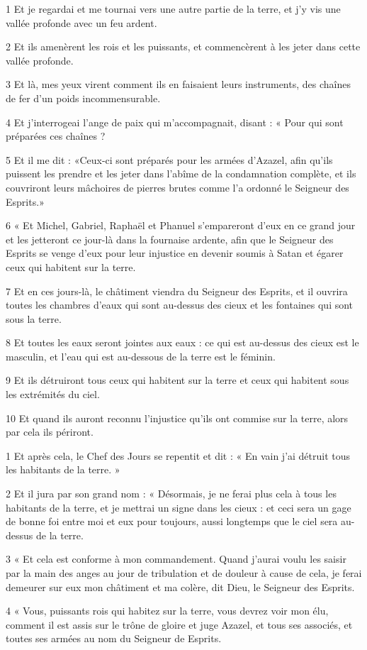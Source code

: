 \par 1 Et je regardai et me tournai vers une autre partie de la terre, et j'y vis une vallée profonde avec un feu ardent.
\par 2 Et ils amenèrent les rois et les puissants, et commencèrent à les jeter dans cette vallée profonde.
\par 3 Et là, mes yeux virent comment ils en faisaient leurs instruments, des chaînes de fer d'un poids incommensurable.
\par 4 Et j'interrogeai l'ange de paix qui m'accompagnait, disant : « Pour qui sont préparées ces chaînes ?
\par 5 Et il me dit : «Ceux-ci sont préparés pour les armées d'Azazel, afin qu'ils puissent les prendre et les jeter dans l'abîme de la condamnation complète, et ils couvriront leurs mâchoires de pierres brutes comme l'a ordonné le Seigneur des Esprits.»
\par 6 « Et Michel, Gabriel, Raphaël et Phanuel s'empareront d'eux en ce grand jour et les jetteront ce jour-là dans la fournaise ardente, afin que le Seigneur des Esprits se venge d'eux pour leur injustice en devenir soumis à Satan et égarer ceux qui habitent sur la terre.
\par 7 Et en ces jours-là, le châtiment viendra du Seigneur des Esprits, et il ouvrira toutes les chambres d'eaux qui sont au-dessus des cieux et les fontaines qui sont sous la terre.
\par 8 Et toutes les eaux seront jointes aux eaux : ce qui est au-dessus des cieux est le masculin, et l'eau qui est au-dessous de la terre est le féminin.
\par 9 Et ils détruiront tous ceux qui habitent sur la terre et ceux qui habitent sous les extrémités du ciel.
\par 10 Et quand ils auront reconnu l'injustice qu'ils ont commise sur la terre, alors par cela ils périront.


\par 1 Et après cela, le Chef des Jours se repentit et dit : « En vain j'ai détruit tous les habitants de la terre. »
\par 2 Et il jura par son grand nom : « Désormais, je ne ferai plus cela à tous les habitants de la terre, et je mettrai un signe dans les cieux : et ceci sera un gage de bonne foi entre moi et eux pour toujours, aussi longtemps que le ciel sera au-dessus de la terre.
\par 3 « Et cela est conforme à mon commandement. Quand j'aurai voulu les saisir par la main des anges au jour de tribulation et de douleur à cause de cela, je ferai demeurer sur eux mon châtiment et ma colère, dit Dieu, le Seigneur des Esprits.
\par 4 « Vous, puissants rois qui habitez sur la terre, vous devrez voir mon élu, comment il est assis sur le trône de gloire et juge Azazel, et tous ses associés, et toutes ses armées au nom du Seigneur de Esprits.

